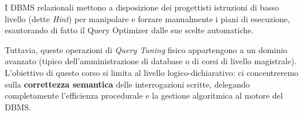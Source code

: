 \begin{dettagli}
I DBMS relazionali mettono a disposizione dei progettisti istruzioni di basso livello (dette \textit{Hint}) per manipolare e forzare manualmente i piani di esecuzione, esautorando di fatto il Query Optimizer dalle sue scelte automatiche. 

Tuttavia, queste operazioni di \textit{Query Tuning} fisico appartengono a un dominio avanzato (tipico dell'amministrazione di database o di corsi di livello magistrale). L'obiettivo di questo corso si limita al livello logico-dichiarativo: ci concentreremo sulla \textbf{correttezza semantica} delle interrogazioni scritte, delegando completamente l'efficienza procedurale e la gestione algoritmica al motore del DBMS.
\end{dettagli}